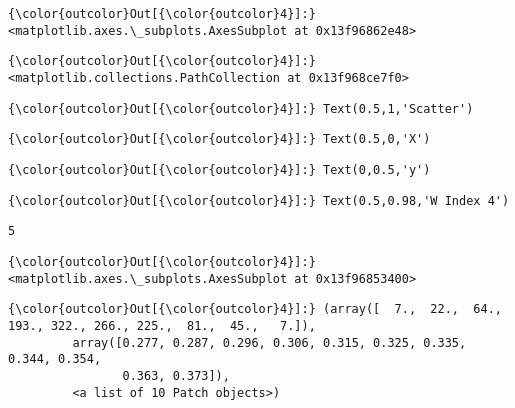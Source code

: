 \documentclass[11pt]{article}
\begin{document}
\begin{Verbatim}[commandchars=\\\{\}]
{\color{outcolor}Out[{\color{outcolor}4}]:} <matplotlib.axes.\_subplots.AxesSubplot at 0x13f96862e48>
\end{Verbatim}
            
\begin{Verbatim}[commandchars=\\\{\}]
{\color{outcolor}Out[{\color{outcolor}4}]:} <matplotlib.collections.PathCollection at 0x13f968ce7f0>
\end{Verbatim}
            
\begin{Verbatim}[commandchars=\\\{\}]
{\color{outcolor}Out[{\color{outcolor}4}]:} Text(0.5,1,'Scatter')
\end{Verbatim}
            
\begin{Verbatim}[commandchars=\\\{\}]
{\color{outcolor}Out[{\color{outcolor}4}]:} Text(0.5,0,'X')
\end{Verbatim}
            
\begin{Verbatim}[commandchars=\\\{\}]
{\color{outcolor}Out[{\color{outcolor}4}]:} Text(0,0.5,'y')
\end{Verbatim}
            
\begin{Verbatim}[commandchars=\\\{\}]
{\color{outcolor}Out[{\color{outcolor}4}]:} Text(0.5,0.98,'W Index 4')
\end{Verbatim}
            
    \begin{Verbatim}[commandchars=\\\{\}]
5

    \end{Verbatim}

\begin{Verbatim}[commandchars=\\\{\}]
{\color{outcolor}Out[{\color{outcolor}4}]:} <matplotlib.axes.\_subplots.AxesSubplot at 0x13f96853400>
\end{Verbatim}
            
\begin{Verbatim}[commandchars=\\\{\}]
{\color{outcolor}Out[{\color{outcolor}4}]:} (array([  7.,  22.,  64., 193., 322., 266., 225.,  81.,  45.,   7.]),
         array([0.277, 0.287, 0.296, 0.306, 0.315, 0.325, 0.335, 0.344, 0.354,
                0.363, 0.373]),
         <a list of 10 Patch objects>)
\end{Verbatim}
            
\end{document}
